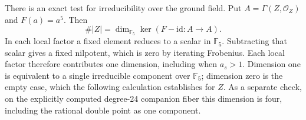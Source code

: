 There is an exact test for irreducibility over the ground field. Put
\(A=\Gamma(Z,\mathcal O_Z)\) and \(F(a)=a^5\). Then
\[
 \#|Z|=\dim_{\mathbb F_5}\ker(F-\mathrm{id}:A\to A).
\]
In each local factor a fixed element reduces to a scalar in
\(\mathbb F_5\). Subtracting that scalar gives a fixed nilpotent,
which is zero by iterating Frobenius. Each local factor therefore
contributes one dimension, including when \(a_s>1\). Dimension one
is equivalent to a single irreducible component over \(\mathbb F_5\);
dimension zero is the empty case, which the following calculation
establishes for \(Z\). As a separate check,
on the explicitly computed degree-24 companion fiber this dimension
is four, including the rational double point as one component.


